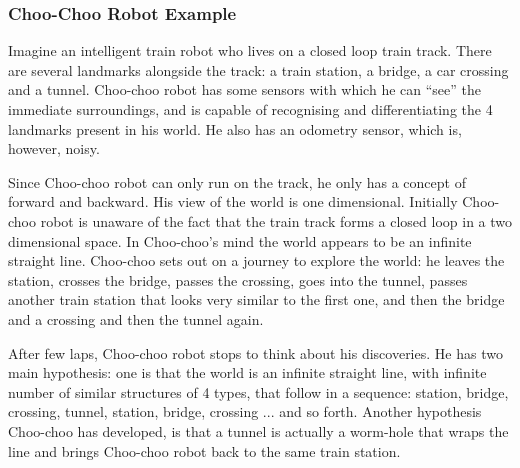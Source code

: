 



\subsubsection{Choo-Choo Robot Example}

Imagine an intelligent train robot who lives on a closed loop train
track. There are several landmarks alongside the track: a train
station, a bridge, a car crossing and a tunnel. Choo-choo robot has
some sensors with which he can ``see'' the immediate surroundings, and
is capable of recognising and differentiating the 4 landmarks
present in his world. He also has an odometry sensor, which is,
however, noisy.

Since Choo-choo robot can only run on the track, he only has a concept
of forward and backward. His view of the world is one dimensional.
Initially Choo-choo robot is unaware of the fact that the train track
forms a closed loop in a two dimensional space. In Choo-choo's mind
the world appears to be an infinite straight line. Choo-choo sets out
on a journey to explore the world: he leaves the station, crosses the
bridge, passes the crossing, goes into the tunnel, passes another
train station that looks very similar to the first one, and then the
bridge and a crossing and then the tunnel again.

After few laps, Choo-choo robot stops to think about his discoveries.
He has two main hypothesis: one is that the world is an infinite
straight line, with infinite number of similar structures of 4 types,
that follow in a sequence: station, bridge, crossing, tunnel, station,
bridge, crossing ... and so forth. Another hypothesis Choo-choo has
developed, is that a tunnel is actually a worm-hole that wraps the
line and brings Choo-choo robot back to the same train station. 

